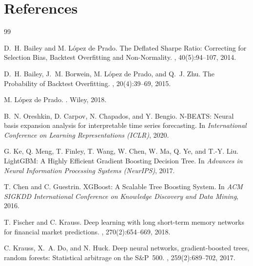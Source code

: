 \documentclass[11pt,a4paper]{article}
\let\oldsection\section
\renewcommand{\section}{\clearpage\oldsection}
\begin{document}
\section{References}\label{app:bib}

\begin{thebibliography}{99}

D.~H. Bailey and M. López de Prado.
\newblock The Deflated Sharpe Ratio: Correcting for Selection Bias, Backtest
Overfitting and Non-Normality.
, 40(5):94--107, 2014.

D.~H. Bailey, J.~M. Borwein, M. López de Prado, and Q.~J. Zhu.
\newblock The Probability of Backtest Overfitting.
, 20(4):39--69, 2015.

M. López de Prado.
.
\newblock Wiley, 2018.

B.~N. Oreshkin, D. Carpov, N. Chapados, and Y. Bengio.
\newblock N-BEATS: Neural basis expansion analysis for interpretable time
series forecasting.
\newblock In {\em International Conference on Learning Representations
(ICLR)}, 2020.

G. Ke, Q. Meng, T. Finley, T. Wang, W. Chen, W. Ma, Q. Ye, and T.-Y. Liu.
\newblock LightGBM: A Highly Efficient Gradient Boosting Decision Tree.
\newblock In {\em Advances in Neural Information Processing Systems (NeurIPS)}, 2017.

T. Chen and C. Guestrin.
\newblock XGBoost: A Scalable Tree Boosting System.
\newblock In {\em ACM SIGKDD International Conference on Knowledge Discovery
and Data Mining}, 2016.

T. Fischer and C. Krauss.
\newblock Deep learning with long short-term memory networks for financial
market predictions.
, 270(2):654--669, 2018.

C. Krauss, X.~A. Do, and N. Huck.
\newblock Deep neural networks, gradient-boosted trees, random forests:
Statistical arbitrage on the S\&P~500.
, 259(2):689--702, 2017.


\end{thebibliography}
\end{document}
